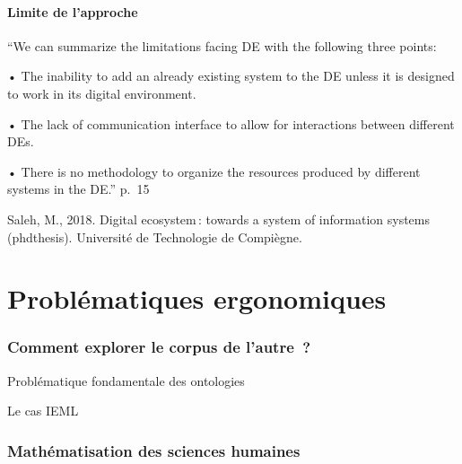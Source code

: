 \documentclass[
  letterpaper,
  DIV=11,
  numbers=noendperiod]{scrreprt}
\begin{document}
\hypertarget{limite-de-lapproche}{%
\subsubsection{Limite de l'approche}\label{limite-de-lapproche}}

``We can summarize the limitations facing DE with the following three
points:

• The inability to add an already existing system to the DE unless it is
designed to work in its digital environment.

• The lack of communication interface to allow for interactions between
different DEs.

• There is no methodology to organize the resources produced by
different systems in the DE.'' p.~15

Saleh, M., 2018. Digital ecosystem\,: towards a system of information
systems (phdthesis). Université de Technologie de Compiègne.

\hypertarget{sec-problemesErgo}{%
\chapter{Problématiques ergonomiques}\label{sec-problemesErgo}}

\hypertarget{comment-explorer-le-corpus-de-lautre}{%
\subsection{Comment explorer le corpus de
l'autre~?}\label{comment-explorer-le-corpus-de-lautre}}

Problématique fondamentale des ontologies

Le cas IEML

\hypertarget{mathuxe9matisation-des-sciences-humaines}{%
\subsection{Mathématisation des sciences
humaines}\label{mathuxe9matisation-des-sciences-humaines}}
\end{document}
